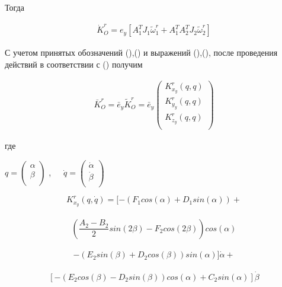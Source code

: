 Тогда\par

\begin{equation}
\label{eq:p3:14}
\begin{alignedat}{2}
\dot{K}_{O}^{r}=e_{y} [ 
	A_{1}^{T}J_{1} \tilde{\omega}_{1}^{r} + A_{1}^{T} A_{2}^{T} J_{2} \tilde{\omega}_{2}^{r} 
] 
\end{alignedat}
\end{equation}

С учетом принятых обозначений (),() и выражений (),(), после проведения действий в соответствии с () получим\par

\begin{equation}
\label{eq:p3:15}
\begin{alignedat}{2}
\bar{K}_{O}^{r}=\bar{e}_{y}\tilde{K}_{O}^{r}=\bar{e}_{y} \left( \begin{matrix}
K_{x_{y}}^{r} \left( q,q \right) \\
K_{y_{y}}^{r} \left( q,q \right) \\
K_{z_{y}}^{r} \left( q,q \right) \\
\end{matrix}
\right) 
\end{alignedat}
\end{equation}

где \par

\( q= \left( \begin{matrix}
\alpha \\
\beta \\
\end{matrix}
\right)  \) ,\ \ \   \( \dot{q}= \left( \begin{matrix}
\dot{\alpha} \\
\dot{\beta} \\
\end{matrix}
\right)  \) \par

\[
K_{x_{y}}^{r} ( q,\dot{q} ) = 
[
	-( 
		F_{1}cos (  \alpha  ) +
		D_{1}sin (  \alpha  )  
	) +  \]\\ \[
	( 
		\frac{A_{2}-B_{2}}{2}sin ( 2 \beta  ) -
		F_{2}cos ( 2 \beta  )  
	) cos (  \alpha  ) \]\\ \[
	- ( 
		E_{2}sin (  \beta  ) +
		D_{2}cos (  \beta  )  
	) sin (  \alpha  )  
] \dot{\alpha} + \]\\ \[
[
	- ( 
		E_{2}cos (  \beta  ) -
		D_{2}sin (  \beta  )  
	) cos (  \alpha  ) +
	C_{2}sin (  \alpha  )  
]  \dot{\beta}	
\]


